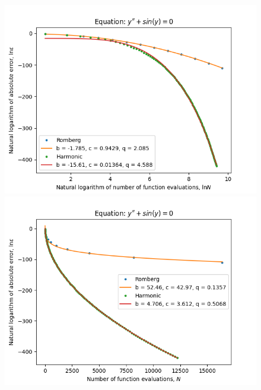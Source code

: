 \begin{figure}[H]
\centering
\begin{minipage}{0.45\textwidth}
\centering
\includegraphics[scale=0.45]{emr_plots/oscillation_hp_log_log_pow_fit_trend.png}
\end{minipage}
\begin{minipage}{0.45\textwidth}
\centering
\includegraphics[scale=0.45]{emr_plots/oscillation_hp_trend.png}
\end{minipage}
\end{figure}

